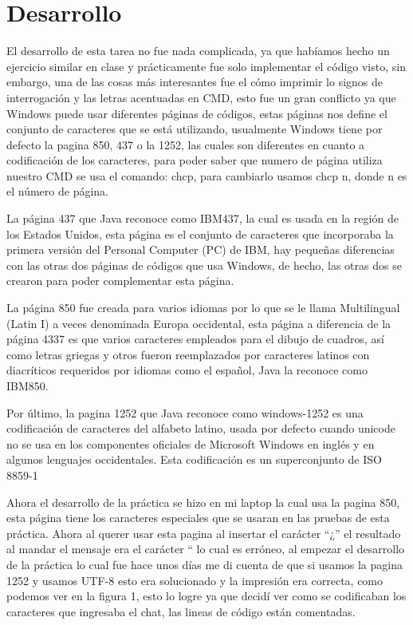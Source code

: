 \documentclass[11pt]{article}
\begin{document}
	\section{Desarrollo}
El desarrollo de esta tarea no fue nada complicada, ya que habíamos hecho un ejercicio similar en clase y prácticamente fue solo implementar el código visto, sin embargo, una de las cosas más interesantes fue el cómo imprimir lo signos de interrogación y las letras acentuadas en CMD, esto fue un gran conflicto ya que Windows puede usar diferentes páginas de códigos, estas páginas nos define el conjunto de caracteres que se está utilizando, usualmente Windows tiene por defecto la pagina 850, 437 o la 1252, las cuales son diferentes en cuanto a codificación de los caracteres, para poder saber que numero de página utiliza nuestro CMD se usa el comando: chcp, para cambiarlo usamos chcp n, donde n es el número de página.\par
La página 437 que Java reconoce como IBM437, la cual es usada en la región de los Estados Unidos, esta página es el conjunto de caracteres que incorporaba la primera versión del Personal Computer (PC) de IBM, hay pequeñas diferencias con las otras dos páginas de códigos que usa Windows, de hecho, las otras dos se crearon para poder complementar esta página.\par
La página 850 fue creada para varios idiomas por lo que se le llama Multilingual (Latin I) a veces denominada Europa occidental, esta página a diferencia de la página 4337 es que varios caracteres empleados para el dibujo de cuadros, así como letras griegas y otros fueron reemplazados por caracteres latinos con diacríticos requeridos por idiomas como el español, Java la reconoce como IBM850.\par
Por último, la pagina 1252 que Java reconoce como windows-1252	 es una codificación de caracteres del alfabeto latino, usada por defecto cuando unicode no se usa en los componentes oficiales de Microsoft Windows en inglés y en algunos lenguajes occidentales. Esta codificación es un superconjunto de ISO 8859-1 \par
Ahora el desarrollo de la práctica se hizo en mi laptop la cual usa la pagina 850, esta página tiene los caracteres especiales que se usaran en las pruebas de esta práctica. Ahora al querer usar esta pagina al insertar el carácter ``¿'' el resultado al mandar el mensaje era el carácter “ lo cual es erróneo, al empezar el desarrollo de la práctica lo cual fue hace unos días me di cuenta de que si usamos la pagina 1252 y usamos UTF-8 esto era solucionado y la impresión era correcta, como podemos ver en la figura 1, esto lo logre ya que decidí ver como se codificaban los caracteres que ingresaba el chat, las lineas de código están comentadas.	
\end{document}

